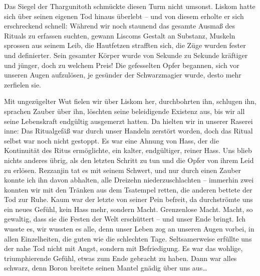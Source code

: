 \documentclass[11pt]{scrreprt}
\begin{document}
Das Siegel der Thargunitoth schmückte diesen Turm nicht umsonst. Liskom hatte sich über seinen eigenen Tod hinaus überlebt – und von diesem erholte er sich erschreckend schnell: Während wir noch staunend das gesamte Ausmaß des Rituals zu erfassen suchten, gewann Liscoms Gestalt an Substanz, Muskeln sprossen aus seinem Leib, die Hautfetzen strafften sich, die Züge wurden fester und definierter. Sein gesamter Körper wurde von Sekunde zu Sekunde kräftiger und jünger, doch zu welchem Preis! Die gefesselten Opfer begannen, sich vor unseren Augen aufzulösen, je gesünder der Schwarzmagier wurde, desto mehr zerfielen sie. \par

Mit ungezügelter Wut fielen wir über Liskom her, durchbohrten ihn, schlugen ihn, sprachen Zauber über ihn, löschten seine beleidigende Existenz aus, bis wir all seine Lebenskraft endgültig ausgemerzt hatten. Da hielten wir in unserer Raserei inne: Das Ritualgefäß war durch unser Handeln zerstört worden, doch das Ritual selbst war noch nicht gestoppt. Es war eine Ahnung von Hass, der die Kontinuität des Ritus ermöglichte, ein kalter, endgültiger, reiner Hass. Uns blieb nichts anderes übrig, als den letzten Schritt zu tun und die Opfer von ihrem Leid zu erlösen. Rezzanjin tat es mit seinem Schwert, und nur durch einen Zauber konnte ich ihn davon abhalten, alle Dreizehn niederzuschlachten – immerhin zwei konnten wir mit den Tränken aus dem Tsatempel retten, die anderen bettete der Tod zur Ruhe. Kaum war der letzte von seiner Pein befreit, da durchströmte uns ein neues Gefühl, kein Hass mehr, sondern Macht. Grenzenlose Macht. Macht, so gewaltig, dass sie die Festen der Welt erschüttert – und unser Ende bringt. Ich wusste es, wir wussten es alle, denn unser Leben zog an unseren Augen vorbei, in allen Einzelheiten, die guten wie die schlechten Tage. Seltsamerweise erfüllte uns der nahe Tod nicht mit Angst, sondern mit Befriedigung. Es war das wohlige, triumphierende Gefühl, etwas zum Ende gebracht zu haben. Dann war alles schwarz, denn Boron breitete seinen Mantel gnädig über uns aus…
\end{document}
